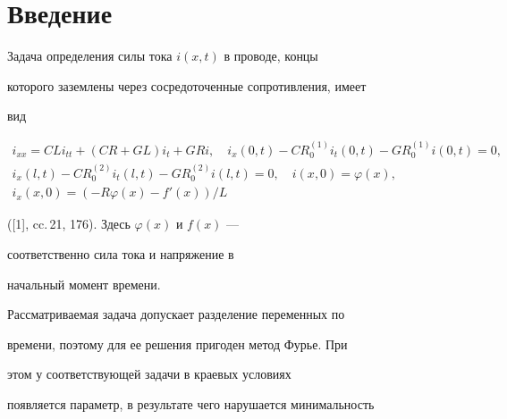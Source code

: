  




\maketitle 


\label{begin} 


 


\section{Введение} 


 


Задача определения силы тока $i(x,t)$ в проводе, концы  


которого заземлены через сосредоточенные сопротивления, имеет  


вид 


\begin{gather*} 


i_{xx}=C L i_{tt}+(C R+G L) i_t+ G R i,\quad 


i_x(0,t)-C R^{(1)}_0 i_t(0,t)- 


G R^{(1)}_0 i(0,t)=0,\\ 


% 


i_x(l,t)-C R^{(2)}_0 i_t(l,t)- 


G R^{(2)}_0 i(l,t)=0,\quad i(x,0)=\varphi(x),\\ 


% 


i_x(x,0)=(-R\varphi(x)-f'(x))/L 


\end{gather*} 


([1], cc.\,21, 176). Здесь $\varphi(x)$ и $f(x)$ --- 


соответственно сила тока и напряжение в  


начальный момент времени.  


 


Рассматриваемая задача допускает разделение переменных по  


времени, поэтому для ее решения пригоден метод Фурье. При  


этом у соответствующей задачи в краевых условиях  


появляется параметр, в результате чего нарушается минимальность  


